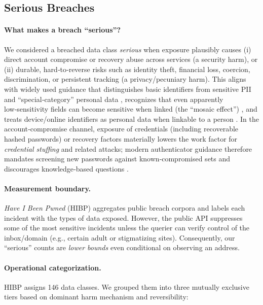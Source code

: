 \documentclass[12pt, letterpaper]{article}
\begin{document}
\subsection{Serious Breaches}\label{sec:serious-breaches}

\paragraph{What makes a breach ``serious''?}
We considered a breached data class \emph{serious} when exposure plausibly causes (i) direct account compromise or recovery abuse across services (a security harm), or (ii) durable, hard‑to‑reverse risks such as identity theft, financial loss, coercion, discrimination, or persistent tracking (a privacy/pecuniary harm). This aligns with widely used guidance that distinguishes basic identifiers from sensitive PII and ``special‑category'' personal data \citep{NIST800122, GDPRArticle9}, recognizes that even apparently low‑sensitivity fields can become sensitive when linked (the ``mosaic effect'') \citep{OMB_M1313, NIST800122}, and treats device/online identifiers as personal data when linkable to a person \citep{GDPRRecital30, ICOOnlineIdentifiers}. In the account‑compromise channel, exposure of credentials (including recoverable hashed passwords) or recovery factors materially lowers the work factor for \emph{credential stuffing} and related attacks; modern authenticator guidance therefore mandates screening new passwords against known‑compromised sets and discourages knowledge‑based questions \citep{NIST80063B, NIST80063FAQ, OWASPCredStuff, kanta2021viable}.

\paragraph{Measurement boundary.}
\textit{Have I Been Pwned} (HIBP) aggregates public breach corpora and labels each incident with the types of data exposed. However, the public API suppresses some of the most sensitive incidents unless the querier can verify control of the inbox/domain (e.g., certain adult or stigmatizing sites). Consequently, our ``serious'' counts are \emph{lower bounds} even conditional on observing an address.

\paragraph{Operational categorization.}
HIBP assigns 146 data classes. We grouped them into three mutually exclusive tiers based on dominant harm mechanism and reversibility:
\end{document}
